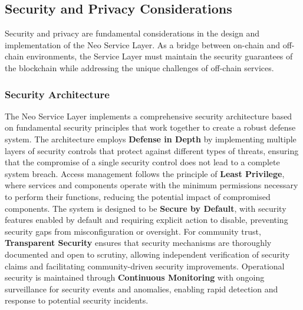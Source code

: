 \documentclass[12pt,a4paper]{article}
\begin{document}
\subsection{Security and Privacy Considerations}
\label{subsec:nsl-security}

Security and privacy are fundamental considerations in the design and implementation of the Neo Service Layer. As a bridge between on-chain and off-chain environments, the Service Layer must maintain the security guarantees of the blockchain while addressing the unique challenges of off-chain services.

\subsubsection{Security Architecture}
\label{subsubsec:security-architecture}

The Neo Service Layer implements a comprehensive security architecture based on fundamental security principles that work together to create a robust defense system. The architecture employs \textbf{Defense in Depth} by implementing multiple layers of security controls that protect against different types of threats, ensuring that the compromise of a single security control does not lead to a complete system breach. Access management follows the principle of \textbf{Least Privilege}, where services and components operate with the minimum permissions necessary to perform their functions, reducing the potential impact of compromised components. The system is designed to be \textbf{Secure by Default}, with security features enabled by default and requiring explicit action to disable, preventing security gaps from misconfiguration or oversight. For community trust, \textbf{Transparent Security} ensures that security mechanisms are thoroughly documented and open to scrutiny, allowing independent verification of security claims and facilitating community-driven security improvements. Operational security is maintained through \textbf{Continuous Monitoring} with ongoing surveillance for security events and anomalies, enabling rapid detection and response to potential security incidents.
\end{document}
